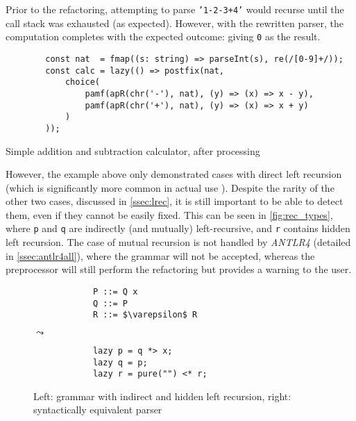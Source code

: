 Prior to the refactoring, attempting to parse \texttt{'1-2-3+4'} would recurse until the call stack was exhausted (as expected).
However, with the rewritten parser, the computation completes with the expected outcome: giving \texttt{0} as the result.

\begin{capminted}
    \begin{verbatim}
        const nat  = fmap((s: string) => parseInt(s), re(/[0-9]+/));
        const calc = lazy(() => postfix(nat,
            choice(
                pamf(apR(chr('-'), nat), (y) => (x) => x - y),
                pamf(apR(chr('+'), nat), (y) => (x) => x + y)
            )
        ));
    \end{verbatim}
    \vspace{-0.5\baselineskip}
    \caption{Simple addition and subtraction calculator, after processing}
    \label{lst:pmcalc_after}
\end{capminted}

However, the example above only demonstrated cases with direct left recursion (which is significantly more common in actual use \cite{parr14}).
Despite the rarity of the other two cases, discussed in \autoref{ssec:lrec}, it is still important to be able to detect them, even if they cannot be easily fixed.
This can be seen in \autoref{fig:rec_types}, where \texttt{p} and \texttt{q} are indirectly (and mutually) left-recursive, and \texttt{r} contains hidden left recursion.
The case of mutual recursion is not handled by \textit{ANTLR4} (detailed in \autoref{ssec:antlr4all}), where the grammar will not be accepted, whereas the preprocessor will still perform the refactoring but provides a warning to the user.

\begin{figure}[H]
    \centering
    \begin{minipage}{0.175\textwidth}
        \begin{lstlisting}
            P ::= Q x
            Q ::= P
            R ::= $\varepsilon$ R
        \end{lstlisting}
    \end{minipage}
    \hfill
    $\leadsto$
    \hfill
    \begin{minipage}{0.35\textwidth}
        \begin{verbatim}
            lazy p = q *> x;
            lazy q = p;
            lazy r = pure("") <* r;
        \end{verbatim}
    \end{minipage}
    \caption{Left: grammar with indirect and hidden left recursion, right: syntactically equivalent parser}
    \label{fig:rec_types}
\end{figure}

